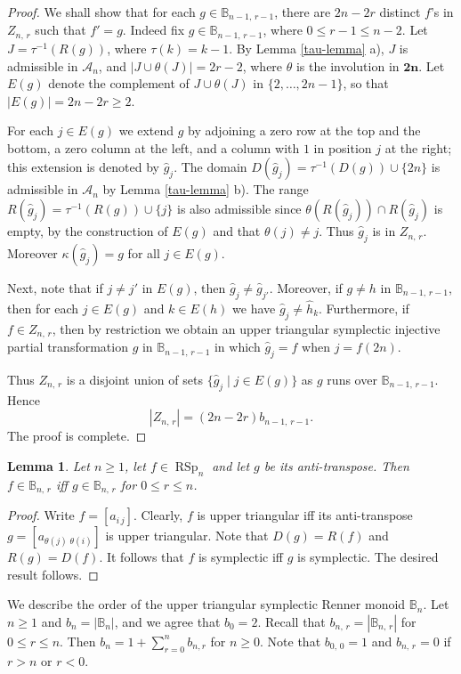 \documentclass[11pt]{article}
\newtheorem{lemma}[theorem]{Lemma}
\newcommand{\ges}{\geqslant}
\newcommand{\les}{\leqslant}
\newcommand{\mb}{\mathbf}
\DeclareMathOperator{\RSp}{RSp}
\begin{document}
\begin{proof}
We shall show that for each $g\in \mathbb B_{n-1,\,r-1}$, there are $2n-2r$ distinct $f$'s in $Z_{n,\,r}$ such that $f'=g$.  Indeed fix $g\in \mathbb B_{n-1,\,r-1}$, 
where $0\les r-1\les n-2$. Let $J=\tau^{-1}(R(g))$, where $\tau(k)=k-1$.
By Lemma \ref{tau-lemma} a), $J$ is admissible in $\mathscr A_n$, and $|J\cup \theta(J)|=2r-2$, where $\theta$ is the involution 
in $\mb {2n}$. Let $E(g)$ denote the complement of $J\cup\theta(J)$ in 
$\{2,\dots, 2n-1\}$, so that $|E(g)|=2n-2r\ge 2$.  


For each  $j\in E(g)$ we extend $g$ by adjoining a zero row at the top and the bottom, a zero column at the left, and a column with $1$ in position $j$ at the right; this extension is denoted by $\hat{g}_j$. The domain
$D(\hat{g}_j)=\tau^{-1}(D(g))\cup\{2n\}$ is admissible in $\mathscr A_n$ by Lemma \ref{tau-lemma} b). The range 
$R(\hat{g}_j)=\tau^{-1}(R(g)) \cup\{j\}$
is also admissible since $\theta(R(\hat g_j))\cap R(\hat g_j)$ is empty, by the construction of $E(g)$ and that $\theta(j)\ne j$. 
Thus $ \hat g_j$ is in $Z_{n,\,r}$. Moreover $\kappa(\hat g_{j})=g$ for all $j\in E(g)$.

Next, note that if $j\ne j'$ in $E(g)$, then $ \hat g_j\ne \hat g_{j'}$.
%
Moreover, if $g\ne h$ in $\mathbb B_{n-1,\,r-1}$, then for each $j\in E(g)$ and $k\in E(h)$ we have
$ \hat g_j\ne  \hat h_k$.
%
Furthermore, if $f\in Z_{n,\,r}$, then by restriction we obtain an upper triangular symplectic injective partial transformation  $g$  in  $\mathbb B_{n-1,\,r-1}$ 
 in which $\hat g_j=f$ when $j=f(2n)$.

Thus $Z_{n,\,r}$ is a disjoint union of sets $\{ \hat g_j \mid j\in E(g)\}$ as $g$ runs over $\mathbb B_{n-1,\,r-1}$. 
Hence
\[
    |Z_{n,\,r}|=(2n-2r)b_{n-1,\,r-1}.
\]
The proof is complete. 
\end{proof}

\begin{lemma}\label{anti-diag-lemma}
Let $n\ges 1$, let $f\in \RSp_n$ and let $g$ be its anti-transpose. Then $f\in \mathbb B_{n,\,r}$  if{f} $g\in \mathbb B_{n,\,r}$ for $0\les r\les n$.
\end{lemma}
\begin{proof}
  Write $f=[a_{i\,j}].$   
  Clearly, $f$ is upper triangular if{f} its anti-transpose $g=[a_{\theta(j)\;\theta(i)}]$ is upper triangular. Note that $D(g)=R(f)$ and $R(g)=D(f)$. It follows that $f$ is symplectic if{f} $g$ is symplectic. The desired result follows.
\end{proof}

We describe the order of the upper triangular symplectic Renner monoid $\mathbb B_n$. 
Let $n\ges 1$ and $b_n=|\mathbb B_n|$, and we agree that $b_{0}=2$.
%
Recall that $b_{n,\,r}=|\mathbb B_{n,\,r}|$ for $0\les r\les n$. Then $b_n=1+\sum\limits_{r=0}^nb_{n,r}$ for $n\ges 0.$ Note that $b_{0,\,0}=1$ and $b_{n,\,r}=0$ if $r>n$ or $r<0$.  
\end{document}
